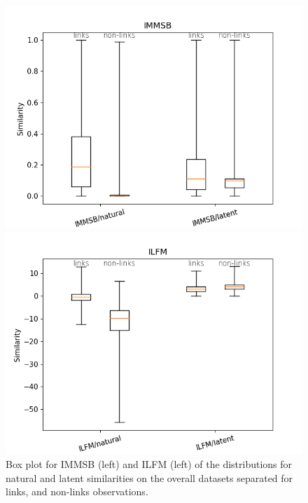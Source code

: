 \begin{figure}[h]
    \centering
        \begin{minipage}{0.24\textwidth}
            \includegraphics[width=\textwidth]{img/corpus/homo_mustach_immsb}
        \end{minipage}
        \begin{minipage}{0.24\textwidth}
            \includegraphics[width=\textwidth]{img/corpus/homo_mustach_ilfm}
        \end{minipage}
        \caption{Box plot for IMMSB (left) and ILFM (left) of the distributions for natural and latent similarities on the overall datasets separated for links, and non-links observations. }
        \label{fig:homo_mustach}
\end{figure}


